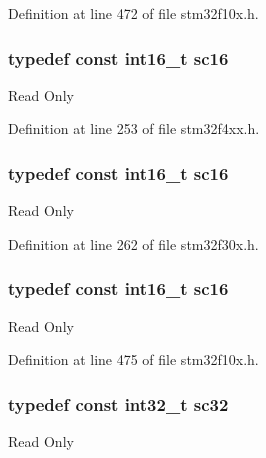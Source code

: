 Definition at line 472 of file stm32f10x.\-h.

\hypertarget{group___exported__types_ga66ab742a0751bb4e7661b8e874f2ddda}{
\subsubsection[{sc16}]{\setlength{\rightskip}{0pt plus 5cm}typedef {\bf const} {\bf int16\-\_\-t} {\bf sc16}}}\label{group___exported__types_ga66ab742a0751bb4e7661b8e874f2ddda}
Read Only 

Definition at line 253 of file stm32f4xx.\-h.

\hypertarget{group___exported__types_ga66ab742a0751bb4e7661b8e874f2ddda}{
\subsubsection[{sc16}]{\setlength{\rightskip}{0pt plus 5cm}typedef {\bf const} {\bf int16\-\_\-t} {\bf sc16}}}\label{group___exported__types_ga66ab742a0751bb4e7661b8e874f2ddda}
Read Only 

Definition at line 262 of file stm32f30x.\-h.

\hypertarget{group___exported__types_ga66ab742a0751bb4e7661b8e874f2ddda}{
\subsubsection[{sc16}]{\setlength{\rightskip}{0pt plus 5cm}typedef {\bf const} {\bf int16\-\_\-t} {\bf sc16}}}\label{group___exported__types_ga66ab742a0751bb4e7661b8e874f2ddda}
Read Only 

Definition at line 475 of file stm32f10x.\-h.

\hypertarget{group___exported__types_gad97679599f3791409523fdb1c6156a28}{
\subsubsection[{sc32}]{\setlength{\rightskip}{0pt plus 5cm}typedef {\bf const} {\bf int32\-\_\-t} {\bf sc32}}}\label{group___exported__types_gad97679599f3791409523fdb1c6156a28}
Read Only 

